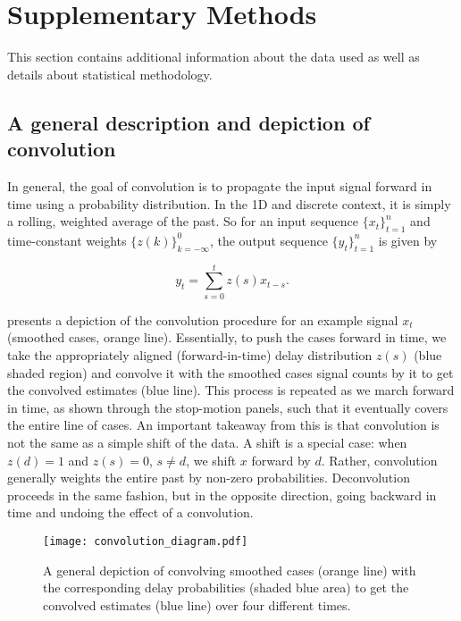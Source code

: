 \section{Supplementary Methods}

This section contains additional information about the data used as well as
details about statistical methodology.

\subsection{A general description and depiction of convolution}
\label{supp:convol}

In general, the goal of convolution is to propagate the input signal forward in
time using a probability distribution. In the 1D and discrete context, it is
simply a rolling, weighted average of the past. So for an input sequence
$\{x_t\}_{t=1}^n$ and time-constant weights $\{z(k)\}_{k=-\infty}^0$, the output
sequence $\{y_t\}_{t=1}^n$ is given by
\begin{linenomath*}
\begin{equation}
    y_t = \sum_{s=0}^t z(s)x_{t-s}.
\end{equation}
\end{linenomath*}
 presents a depiction of the convolution procedure for an
example signal $x_t$ (smoothed cases, orange line). Essentially, to push the
cases forward in time, we take the appropriately aligned (forward-in-time) delay
distribution $z(s)$ (blue shaded region) and convolve it with the smoothed cases
signal counts by it to get the convolved  estimates (blue line). This process is
repeated as we march forward in time, as shown through the stop-motion panels,
such that it eventually covers the entire line of cases. An important takeaway
from this is that convolution is not the same as a simple shift of the data.
A shift is a special case: when $z(d)=1$ and $z(s)=0$, $s\neq d$, we shift $x$
forward by $d$. Rather, convolution generally weights the entire past by
non-zero probabilities. Deconvolution proceeds in the same fashion, but in the
opposite direction, going backward in time and undoing the effect of a
convolution. 

\begin{figure}[H]
\centering
    \texttt{[image: convolution\_diagram.pdf]}
    \caption{A general depiction of convolving smoothed cases (orange line) with the corresponding delay probabilities (shaded blue area) to get the convolved estimates (blue line) over four different times.}
    \label{fig:convol}
\end{figure}

